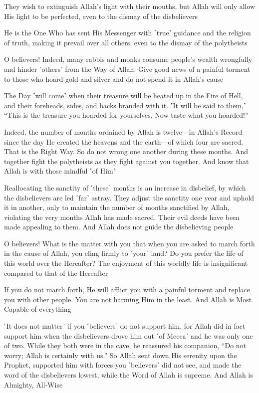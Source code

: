 They wish to extinguish Allah’s light with their mouths, but Allah will only allow His light to be perfected, even to the dismay of the disbelievers

He is the One Who has sent His Messenger with ˹true˺ guidance and the religion of truth, making it prevail over all others, even to the dismay of the polytheists

O believers! Indeed, many rabbis and monks consume people’s wealth wrongfully and hinder ˹others˺ from the Way of Allah. Give good news of a painful torment to those who hoard gold and silver and do not spend it in Allah’s cause

The Day ˹will come˺ when their treasure will be heated up in the Fire of Hell, and their foreheads, sides, and backs branded with it. ˹It will be said to them,˺ “This is the treasure you hoarded for yourselves. Now taste what you hoarded!”

Indeed, the number of months ordained by Allah is twelve—in Allah’s Record since the day He created the heavens and the earth—of which four are sacred. That is the Right Way. So do not wrong one another during these months. And together fight the polytheists as they fight against you together. And know that Allah is with those mindful ˹of Him˺

Reallocating the sanctity of ˹these˺ months is an increase in disbelief, by which the disbelievers are led ˹far˺ astray. They adjust the sanctity one year and uphold it in another, only to maintain the number of months sanctified by Allah, violating the very months Allah has made sacred. Their evil deeds have been made appealing to them. And Allah does not guide the disbelieving people

O believers! What is the matter with you that when you are asked to march forth in the cause of Allah, you cling firmly to ˹your˺ land? Do you prefer the life of this world over the Hereafter? The enjoyment of this worldly life is insignificant compared to that of the Hereafter

If you do not march forth, He will afflict you with a painful torment and replace you with other people. You are not harming Him in the least. And Allah is Most Capable of everything

˹It does not matter˺ if you ˹believers˺ do not support him, for Allah did in fact support him when the disbelievers drove him out ˹of Mecca˺ and he was only one of two. While they both were in the cave, he reassured his companion, “Do not worry; Allah is certainly with us.” So Allah sent down His serenity upon the Prophet, supported him with forces you ˹believers˺ did not see, and made the word of the disbelievers lowest, while the Word of Allah is supreme. And Allah is Almighty, All-Wise

